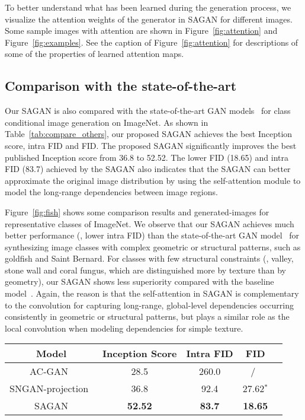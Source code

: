 \documentclass{article}
\begin{document}
To better understand what has been learned during the generation process, we visualize the attention weights of the generator in SAGAN for different images. Some sample images with attention are shown in Figure~\ref{fig:attention} and Figure~\ref{fig:examples}. 
See the caption of Figure~\ref{fig:attention} for descriptions of some of the properties of learned attention maps. 



\subsection{Comparison with the state-of-the-art} \label{sec:sagan_compare}

Our SAGAN is also compared with the state-of-the-art GAN models~\cite{Odena2016,Miyato18b} for class conditional image generation on ImageNet. As shown in Table~\ref{tab:compare_others}, our proposed SAGAN achieves the best Inception score, intra FID and FID. The proposed SAGAN significantly improves the best published Inception score from 36.8 to 52.52. The lower FID (18.65) and intra FID (83.7) achieved by the SAGAN also indicates that the SAGAN can better approximate the original image distribution by using the self-attention module to model the long-range dependencies between image regions. 

Figure~\ref{fig:fish} shows some comparison results and generated-images for representative classes of ImageNet.  We observe that our SAGAN achieves much better performance (\ie, lower intra FID) than the state-of-the-art GAN model~\cite{Miyato18b} for synthesizing image classes with complex geometric or structural patterns, such as goldfish and Saint Bernard. For classes with few structural constraints (\eg, valley, stone wall and coral fungus, which are distinguished more by texture than by geometry), our SAGAN shows less superiority compared with the baseline model~\cite{Miyato18b}. Again, the reason is that the self-attention in SAGAN is complementary to the convolution for capturing long-range, global-level dependencies occurring consistently in geometric or structural patterns, but plays a similar role as the local convolution when modeling dependencies for simple texture.  
\begin{table*}[bt]
\begin{center}
\normalfont
\begin{tabular}{|c|c|c|c|c|}
\hline
Model                & Inception Score   &Intra FID   & FID \\
\hline
AC-GAN~\cite{Odena2016}              &28.5  &260.0       &/\ \\
\hline
SNGAN-projection~\cite{Miyato18b} &36.8  &92.4        & 27.62$^*$ \\
\hline
SAGAN                             &\bf52.52 &\bf 83.7 &\bf18.65 \\
\hline
\end{tabular}
\end{center}
\caption{Comparison of the proposed SAGAN with state-of-the-art GAN models~\cite{Odena2016,Miyato18b} for class conditional image generation on ImageNet. FID of SNGAN-projection is calculated from officially released weights.}
\label{tab:compare_others} 
\end{table*}
\end{document}
